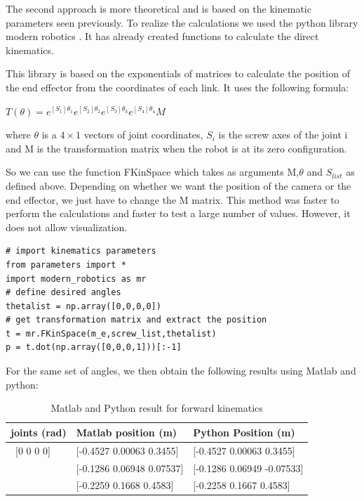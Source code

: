 \bigbreak
The second approach is more theoretical and is based on the kinematic parameters seen previously. To realize the calculations we used the python library modern robotics \cite{Mordern_Robotic}. It has already created functions to calculate the direct kinematics. 

\bigbreak
This library is based on the exponentials of matrices to calculate the position of the end effector from the coordinates of each link. It uses the following formula: 

\begin{center}
    $T(\theta) = e^{[S_1]\theta_1}e^{[S_2]\theta_2}e^{[S_3]\theta_3}e^{[S_4]\theta_4}M$    
\end{center}
where $\theta$ is a $4\times1$ vectors of joint coordinates, $S_i$ is the screw axes of the joint i and M is the transformation matrix when the robot is at its zero configuration.


\bigbreak
So we can use the function FKinSpace which takes as arguments M,$\theta$ and $S_{list}$ as defined above. Depending on whether we want the position of the camera or the end effector, we just have to change the M matrix. This method was faster to perform the calculations and faster to test a large number of values. However, it does not allow visualization.

\begin{verbatim}
# import kinematics parameters
from parameters import * 
import modern_robotics as mr
# define desired angles 
thetalist = np.array([0,0,0,0])
# get transformation matrix and extract the position
t = mr.FKinSpace(m_e,screw_list,thetalist)
p = t.dot(np.array([0,0,0,1]))[:-1]
\end{verbatim}

\bigbreak
For the same set of angles, we then obtain the following results using Matlab and python: 
\begin{table}[ht]
    \centering
    \begin{tabular}{|p{4cm} | p{4.5cm} | p{4.5cm}|} 
        \hline
        \textbf{joints (rad)} & \textbf{Matlab position (m)} & \textbf{Python Position (m)}\\ [0.3ex] 
        \hline\
        [0 0 0 0] & [-0.4527 0.00063 0.3455] & [-0.4527 0.00063 0.3455] \\ 
        \hline
        [pi/4,-pi/3,0,pi/3] & [-0.1286 0.06948 0.07537] & [-0.1286  0.06949 -0.07533] \\ 
        \hline
        [pi/4,pi/6,-pi/6,pi/3]& [-0.2259 0.1668 0.4583] & [-0.2258  0.1667  0.4583] \\ 
        \hline
    \end{tabular}
    \caption{Matlab and Python result for forward kinematics}
\end{table}

